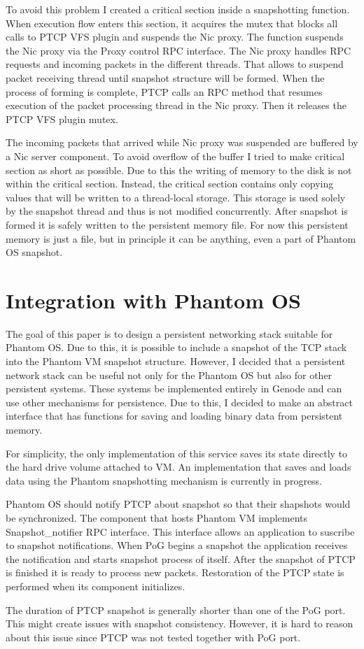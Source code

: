 To avoid this problem I created a critical section inside a snapshotting
function. When execution flow enters this section, it acquires the mutex that
blocks all calls to PTCP VFS plugin and suspends the Nic proxy. The function
suspends the Nic proxy via the Proxy control RPC interface. The Nic proxy 
handles RPC requests and incoming packets in the different threads. That allows
to suspend packet receiving thread until snapshot structure will be formed.
When the process of forming is complete, PTCP calls an RPC method that resumes
execution of the packet processing thread in the Nic proxy. Then it releases
the PTCP VFS plugin mutex. 

The incoming packets that arrived while Nic proxy was suspended are buffered by
a Nic server component. To avoid overflow of the buffer I tried to make
critical section as short as possible. Due to this the writing of memory to the
disk is not within the critical section. Instead, the critical section contains
only copying values that will be written to a thread-local storage. This
storage is used solely by the snapshot thread and thus is not modified
concurrently. After snapshot is formed it is safely written to the persistent
memory file. For now this persistent memory is just a file, but in principle it
can be anything, even a part of Phantom OS snapshot.

\section{Integration with Phantom OS}

The goal of this paper is to design a persistent networking stack suitable for
Phantom OS. Due to this, it is possible to include a snapshot of the TCP stack
into the Phantom VM snapshot structure. However, I decided that a persistent
network stack can be useful not only for the Phantom OS but also for other
persistent systems. These systems be implemented entirely in Genode and can use
other mechanisms for persistence. Due to this, I decided to make an abstract
interface that has functions for saving and loading binary data from persistent
memory.

For simplicity, the only implementation of this service saves its state
directly to the hard drive volume attached to VM. An implementation that saves
and loads data using the Phantom snapshotting mechanism is currently in
progress.

Phantom OS should notify PTCP about snapshot so that their shapshots would be
synchronized. The component that hosts Phantom VM implements Snapshot\_notifier
RPC interface. This interface allows an application to suscribe to snapshot
notifications. When PoG begins a snapshot the application receives the
notification and starts snapshot process of itself. After the snapshot of PTCP
is finished it is ready to process new packets. Restoration of the PTCP state
is performed when its component initializes.

The duration of PTCP snapshot is generally shorter than one of the PoG port.
This might create issues with snapshot consistency. However, it is hard to
reason about this issue since PTCP was not tested together with PoG port.
